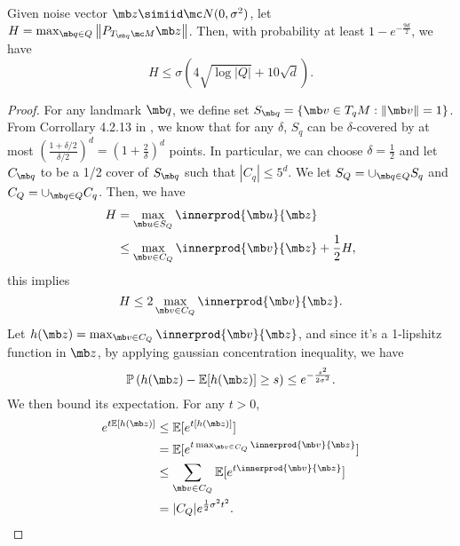 
{
\begin{lemma}\label{Phase II Probability bound on H}
Given noise vector $\mb z \simiid \mc N(0,\sigma^2)$, let $H = \max_{\mb q \in Q}\left\|P_{T_{\mb q}\mc M} \mb z \right\|$. 
Then, with probability at least $1 - e^{-\frac{9d}{2}}$, we have
\begin{equation}
 H \le \sigma\left(4\sqrt{\log|Q|}+10\sqrt{d}\right).
\end{equation}
\end{lemma}
\begin{proof}
For any landmark $\mb q$, we define set $S_{\mb q} = \left\{\mb v \in T_qM: \|\mb v\| = 1\right\}$. From Corrollary 4.2.13 in \cite{vershynin2018high}, we know that for any $\delta$, $S_q$ can be $\delta$-covered by at most $\left(\frac{1+\delta/2}{\delta/2}\right)^d = \left(1+\frac{2}{\delta}\right)^d$ points. In particular, we can choose $\delta =\frac{1}{2}$ and let $C_{\mb q}$ to be a 1/2 cover of $S_{\mb q}$ such that $|C_q| \le 5^d$. We let $S_Q = \cup_{\mb q\in Q}S_q$ and $C_Q = \cup_{\mb q\in Q}C_q$. Then, we have
\begin{align}
H &= \max_{\mb u \in S_Q} \innerprod{\mb u}{\mb z} \\
  &\le \max_{\mb v \in C_Q} \innerprod{\mb v}{\mb z} + \frac{1}{2}H, \\
\end{align}
this implies 
\begin{equation}\label{upper bound H by covering}
H \le 2 \max_{\mb v \in C_Q} \innerprod{\mb v}{\mb z}.
\end{equation}
Let $h(\mb z) = \max_{\mb v \in C_Q} \innerprod{\mb v}{\mb z}$, and since it's a 1-lipshitz function in $\mb z$, by applying gaussian concentration inequality, we have 
\begin{equation}\label{eq:Gaussian Concentration Bounds for Liptshiz function}
    \mathbb P\left(h(\mb z) - \mathbb E[h(\mb z)] \geq s \right) \leq e^{-\frac{s^2}{2\sigma^2}}.
\end{equation}
We  then bound its expectation. For any $t>0$,
\begin{equation}
    \begin{aligned}
        e^{t \mathbb E[h(\mb z)]}
        &\le \mathbb E[e^{t [h(\mb z)]}]\\
        &= \mathbb E[e^{t\max_{\mb v \in C_Q} \innerprod{\mb v}{\mb z}}] \\
        &\leq \sum_{\mb v \in C_Q} \mathbb E[e^{t\innerprod{\mb v}{\mb z}}] \\
        &= |C_Q| e^{\frac{1}{2}\sigma^2 t^2}.

\end{aligned}
\end{equation}
\end{proof}}
